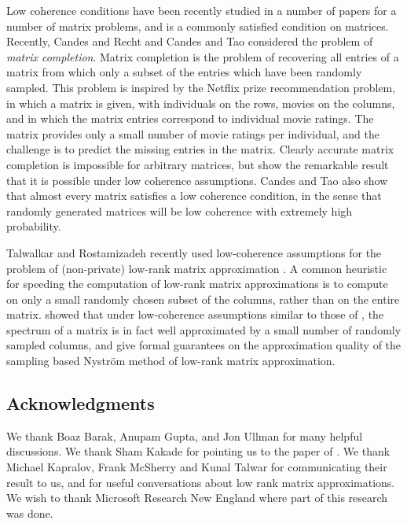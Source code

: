 \documentclass[letterpaper,11pt]{article}
\theoremstyle{definition}
\begin{document}
Low coherence conditions have been recently studied in a number of papers for
a number of matrix problems, and is a commonly satisfied condition on
matrices. Recently, Candes and Recht \cite{CandesR09} and Candes and Tao
\cite{CandesT10} considered the problem of \emph{matrix completion}. Matrix
completion is the problem of recovering all entries of a matrix from which
only a subset of the entries which have been randomly sampled. This problem is
inspired by the Netflix prize recommendation problem, in which a matrix is
given, with individuals on the rows, movies on the columns, and in which the
matrix entries correspond to individual movie ratings. The matrix provides
only a small number of movie ratings per individual, and the challenge is to
predict the missing entries in the matrix.  Clearly accurate matrix completion
is impossible for arbitrary matrices, but \cite{CandesR09,CandesT10} show the
remarkable result that it is possible under low coherence assumptions. Candes
and Tao \cite{CandesT10} also show that almost every matrix satisfies a low
coherence condition, in the sense that randomly generated matrices will be low
coherence with extremely high probability.

Talwalkar and Rostamizadeh recently used low-coherence assumptions for the
problem of (non-private) low-rank matrix approximation \cite{TalwalkarR10}. A common
heuristic for speeding the computation of low-rank matrix approximations is to
compute on only a small randomly chosen subset of the columns, rather than on
the entire matrix. \cite{TalwalkarR10} showed that under low-coherence assumptions
similar to those of \cite{CandesR09,CandesT10}, the spectrum of a matrix is in fact
well approximated by a small number of randomly sampled columns, and give
formal guarantees on the approximation quality of the sampling based
Nystr\"{o}m method of low-rank matrix approximation.

\subsection*{Acknowledgments}

We thank Boaz Barak, Anupam Gupta, and Jon Ullman for many helpful
discussions. We thank Sham Kakade for pointing us to the paper of
\cite{HalkoMT11}. We thank Michael Kapralov, Frank McSherry and Kunal Talwar
for communicating their result to us, and for useful
conversations about low rank matrix approximations. We wish to thank
Microsoft Research New England where part of this research was done.
\end{document}
